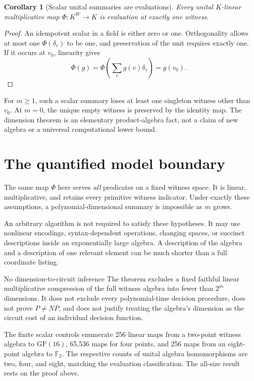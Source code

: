 \documentclass[11pt,letterpaper,oneside]{report}
\theoremstyle{komorebi}
\newtheorem{corollary}[theorem]{Corollary}
\newcommand{\F}{\mathbb F_2}
\begin{document}
\begin{corollary}[Scalar unital summaries are evaluations]\label{cor:scalar-eval}
Every unital $K$-linear multiplicative map $\Phi:K^W\to K$ is evaluation at exactly one witness.
\end{corollary}
\begin{proof}
An idempotent scalar in a field is either zero or one. Orthogonality allows at most one $\Phi(\delta_v)$ to be one, and preservation of the unit requires exactly one. If it occurs at $v_0$, linearity gives
\[
 \Phi(g)=\Phi\left(\sum_v g(v)\delta_v\right)=g(v_0).
\]
\end{proof}
For $m\ge1$, such a scalar summary loses at least one singleton witness other than $v_0$. At $m=0$, the unique empty witness is preserved by the identity map. The dimension theorem is an elementary product-algebra fact, not a claim of new algebra or a universal computational lower bound.

\section{The quantified model boundary}
The same map $\Phi$ here serves \emph{all} predicates on a fixed witness space. It is linear, multiplicative, and retains every primitive witness indicator. Under exactly these assumptions, a polynomial-dimensional summary is impossible as $m$ grows.

An arbitrary algorithm is not required to satisfy these hypotheses. It may use nonlinear encodings, syntax-dependent operations, changing spaces, or succinct descriptions inside an exponentially large algebra. A description of the algebra and a description of one relevant element can be much shorter than a full coordinate listing.

\begin{scopebox}{No dimension-to-circuit inference}
The theorem excludes a fixed faithful linear multiplicative compression of the full witness algebra into fewer than $2^m$ dimensions. It does not exclude every polynomial-time decision procedure, does not prove $P\ne NP$, and does not justify treating the algebra's dimension as the circuit cost of an individual decision function.
\end{scopebox}

The finite scalar controls enumerate 256 linear maps from a two-point witness algebra to $\mathrm{GF}(16)$, 65,536 maps for four points, and 256 maps from an eight-point algebra to $\F$. The respective counts of unital algebra homomorphisms are two, four, and eight, matching the evaluation classification. The all-size result rests on the proof above.
\end{document}
